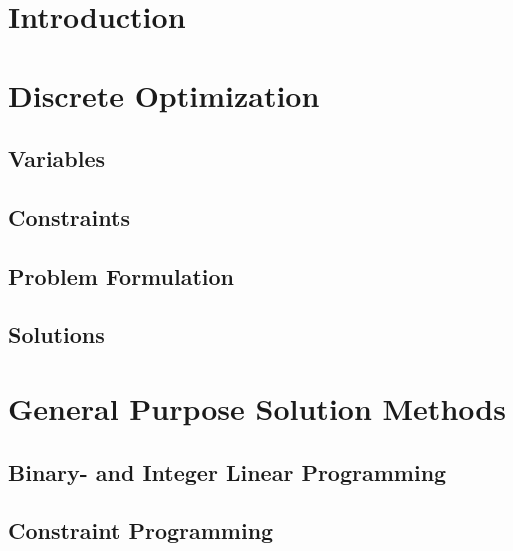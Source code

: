 \documentclass[a4paper,11pt]{article}
\begin{document}


\thispagestyle{empty}
\tableofcontents
\thispagestyle{empty}

\newpage
\setcounter{page}{1}
\section{Introduction}
 
 \newpage
 
\section{Discrete Optimization}

  \subsection{Variables} 
  \subsection{Constraints}
  \subsection{Problem Formulation} %
  
  \subsection{Solutions}
  
  
\newpage  
\section{General Purpose Solution Methods}  
  
  \subsection{Binary- and Integer Linear Programming} %
  
  
  \subsection{Constraint Programming}
  
\end{document}
